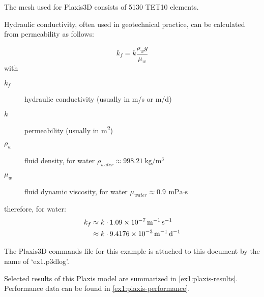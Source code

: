 The mesh used for Plaxis3D consists of 5130 TET10 elements.

Hydraulic conductivity, often used in geotechnical practice, can be calculated
from permeability as follows:

\begin{equation}
    k_f = k \frac{\rho_w g}{\mu_w}
\end{equation}
with
\begin{description}
    \item[$k_f$] hydraulic conductivity (usually in \unit[per-mode = symbol]{\metre\per\second} or \unit[per-mode = symbol]{\metre\per\day})
    \item[$k$] permeability (usually in \unit[per-mode = symbol]{\square\metre})
    \item[$\rho_w$] fluid density, for water $\rho_{water} \approx \SI[per-mode = symbol]{998.21}{\kilogram\per\cubic\metre}$
    \item[$\mu_w$] fluid dynamic viscosity, for water $\mu_{water} \approx \SI{0.9}{\milli\pascal\cdot\second}$
\end{description}

\vspace{1em}

therefore, for water:
\begin{equation}
    \begin{split}
        k_f & \approx k \cdot \qty{1.09E-7}{\per\metre\per\second} \\
            & \approx k \cdot \qty{9.4176E-3}{\per\metre\per\day}
    \end{split}
\end{equation}

The Plaxis3D commands file for this example is attached to this document by the
name of ‘ex1.p3dlog’. 

Selected results of this Plaxis model are summarized in \autoref{ex1:plaxis-results}.
Performance data can be found in \autoref{ex1:plaxis-performance}.


